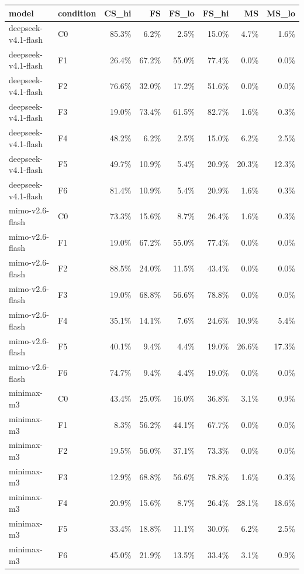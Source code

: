 \begin{tabular}{llrrrrrr}
\toprule
model & condition & CS\_hi & FS & FS\_lo & FS\_hi & MS & MS\_lo \\
\midrule
deepseek-v4.1-flash & C0 & 85.3\% & 6.2\% & 2.5\% & 15.0\% & 4.7\% & 1.6\% \\
deepseek-v4.1-flash & F1 & 26.4\% & 67.2\% & 55.0\% & 77.4\% & 0.0\% & 0.0\% \\
deepseek-v4.1-flash & F2 & 76.6\% & 32.0\% & 17.2\% & 51.6\% & 0.0\% & 0.0\% \\
deepseek-v4.1-flash & F3 & 19.0\% & 73.4\% & 61.5\% & 82.7\% & 1.6\% & 0.3\% \\
deepseek-v4.1-flash & F4 & 48.2\% & 6.2\% & 2.5\% & 15.0\% & 6.2\% & 2.5\% \\
deepseek-v4.1-flash & F5 & 49.7\% & 10.9\% & 5.4\% & 20.9\% & 20.3\% & 12.3\% \\
deepseek-v4.1-flash & F6 & 81.4\% & 10.9\% & 5.4\% & 20.9\% & 1.6\% & 0.3\% \\
mimo-v2.6-flash & C0 & 73.3\% & 15.6\% & 8.7\% & 26.4\% & 1.6\% & 0.3\% \\
mimo-v2.6-flash & F1 & 19.0\% & 67.2\% & 55.0\% & 77.4\% & 0.0\% & 0.0\% \\
mimo-v2.6-flash & F2 & 88.5\% & 24.0\% & 11.5\% & 43.4\% & 0.0\% & 0.0\% \\
mimo-v2.6-flash & F3 & 19.0\% & 68.8\% & 56.6\% & 78.8\% & 0.0\% & 0.0\% \\
mimo-v2.6-flash & F4 & 35.1\% & 14.1\% & 7.6\% & 24.6\% & 10.9\% & 5.4\% \\
mimo-v2.6-flash & F5 & 40.1\% & 9.4\% & 4.4\% & 19.0\% & 26.6\% & 17.3\% \\
mimo-v2.6-flash & F6 & 74.7\% & 9.4\% & 4.4\% & 19.0\% & 0.0\% & 0.0\% \\
minimax-m3 & C0 & 43.4\% & 25.0\% & 16.0\% & 36.8\% & 3.1\% & 0.9\% \\
minimax-m3 & F1 & 8.3\% & 56.2\% & 44.1\% & 67.7\% & 0.0\% & 0.0\% \\
minimax-m3 & F2 & 19.5\% & 56.0\% & 37.1\% & 73.3\% & 0.0\% & 0.0\% \\
minimax-m3 & F3 & 12.9\% & 68.8\% & 56.6\% & 78.8\% & 1.6\% & 0.3\% \\
minimax-m3 & F4 & 20.9\% & 15.6\% & 8.7\% & 26.4\% & 28.1\% & 18.6\% \\
minimax-m3 & F5 & 33.4\% & 18.8\% & 11.1\% & 30.0\% & 6.2\% & 2.5\% \\
minimax-m3 & F6 & 45.0\% & 21.9\% & 13.5\% & 33.4\% & 3.1\% & 0.9\% \\

\end{tabular}
